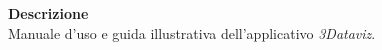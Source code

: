 \begin{titlepage}
\begin{center}
	\large \textbf{Descrizione} \\
	Manuale d'uso e guida illustrativa dell'applicativo \textit{3Dataviz}.
	
	\end{center}
\end{titlepage}
